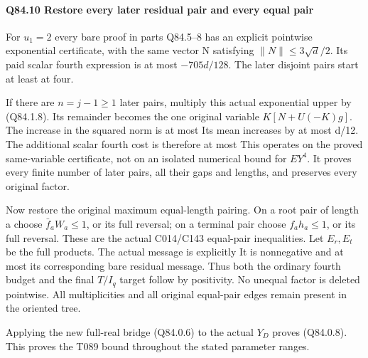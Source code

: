 \paragraph{Q84.10 Restore every later residual pair and every equal pair}\label{part:Q84.10}

For \(u_1=2\) every bare proof in parts Q84.5--8 has an explicit pointwise
exponential certificate, with the same vector N satisfying
\(\|N\|\le3\sqrt d/2\). Its paid scalar fourth expression is at most
\(-705d/128\). The later disjoint pairs start at least at four.

If there are \(n=j-1\ge 1\) later pairs, multiply this actual exponential
upper by (Q84.1.8). Its remainder becomes the one original variable
\(K[N+U(-K)g]\). The increase in the squared norm is at most
Its mean increases by at most d/12. The additional scalar fourth cost
is therefore at most
This operates on the proved same-variable certificate, not on an isolated
numerical bound for \(EY^4\). It proves every finite number of later pairs,
all their gaps and lengths, and preserves every original factor.

Now restore the original maximum equal-length pairing. On a root pair of
length a choose \(\bar f_aW_a\le1\), or its full reversal; on a terminal pair
choose \(f_ah_a\le1\), or its full reversal. These are the actual
C014/C143 equal-pair inequalities. Let \(E_r,\allowbreak  E_t\) be the full products.
The actual message is explicitly
It is nonnegative and at most its corresponding bare residual message.
Thus both the ordinary fourth budget and the final \(T/I_q\) target follow
by positivity. No unequal factor is deleted pointwise. All multiplicities
and all original equal-pair edges remain present in the oriented tree.

Applying the new full-real bridge (Q84.0.6) to the actual \(Y_D\) proves (Q84.0.8).
This proves the T089 bound throughout the stated parameter ranges.


